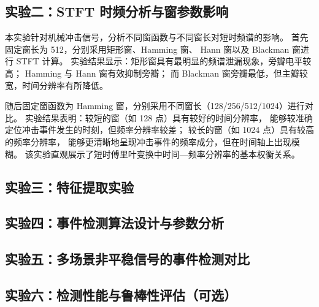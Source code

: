 \documentclass{xjtureport}
\begin{document}
\subsection{实验二：STFT 时频分析与窗参数影响}

本实验针对机械冲击信号，分析不同窗函数与不同窗长对短时频谱的影响。
首先固定窗长为 512，分别采用矩形窗、Hamming 窗、
Hann 窗以及 Blackman 窗进行 STFT 计算。
实验结果显示：矩形窗具有最明显的频谱泄漏现象，旁瓣电平较高；
Hamming 与 Hann 窗有效抑制旁瓣；
而 Blackman 窗旁瓣最低，但主瓣较宽，时间分辨率有所降低。

随后固定窗函数为 Hamming 窗，分别采用不同窗长（128/256/512/1024）进行对比。
实验结果表明：较短的窗（如 128 点）具有较好的时间分辨率，
能够较准确定位冲击事件发生的时刻，但频率分辨率较差；
较长的窗（如 1024 点）具有较高的频率分辨率，
能够更清晰地呈现冲击事件的频率成分，但在时间轴上出现模糊。
该实验直观展示了短时傅里叶变换中时间—频率分辨率的基本权衡关系。


\subsection{实验三：特征提取实验}
\subsection{实验四：事件检测算法设计与参数分析}
\subsection{实验五：多场景非平稳信号的事件检测对比}
\subsection{实验六：检测性能与鲁棒性评估（可选）}
\end{document}
